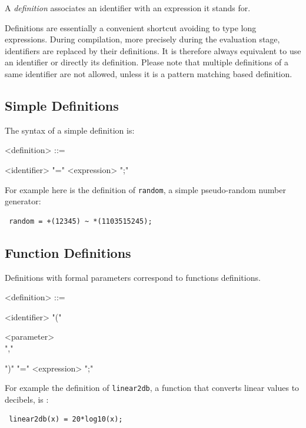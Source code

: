 \documentclass[a4paper,10pt]{book}
\begin{document}
A \textit{definition} associates an identifier with an expression it stands for. 

Definitions are essentially a convenient shortcut avoiding to type long expressions. During compilation, more precisely during the evaluation stage, identifiers are replaced by their definitions. It is therefore always equivalent to use an identifier or directly its definition. Please note that multiple definitions of a same identifier are not allowed, unless it is a pattern matching based definition.

\subsection{Simple Definitions}

The syntax of a simple definition is:

\begin{grammar}
  <definition> ::= 
  \begin{syntdiag}
    <identifier> "=" <expression> ";"
  \end{syntdiag}
\end{grammar}

For example here is the definition of \lstinline'random', a simple pseudo-random number generator:

\begin{lstlisting}
 random = +(12345) ~ *(1103515245);
\end{lstlisting}


\subsection{Function Definitions}

Definitions with formal parameters correspond to functions definitions.


\begin{grammar}
  <definition> ::= 
  \begin{syntdiag}
    <identifier> "(" 
    \begin{rep}
      <parameter> \\ ","
    \end{rep}
    ")" "=" <expression> ";"
  \end{syntdiag}
\end{grammar}

For example the definition of \lstinline'linear2db', a function that converts linear values to decibels, is :

\begin{lstlisting}
 linear2db(x) = 20*log10(x);
\end{lstlisting}
 
\end{document}

